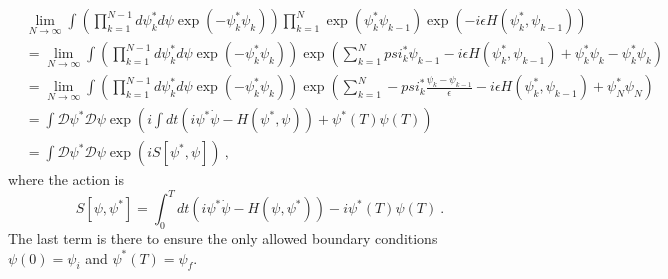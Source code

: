     \begin{equation*}
    \begin{aligned}
        & \lim_{N \rightarrow \infty} \int ( \prod_{k=1}^{N-1} d\psi^*_k d\psi \exp(- \psi^*_k \psi_k) ) \prod_{k=1}^{N} \exp(\psi^*_k \psi_{k-1}) \exp(- i \epsilon H (\psi^*_k, \psi_{k-1})) \\ & = \lim_{N \rightarrow \infty} \int ( \prod_{k=1}^{N-1} d\psi^*_k d\psi \exp(- \psi^*_k \psi_k) ) \exp( \sum_{k=1}^{N} psi^*_k \psi_{k-1} - i \epsilon H (\psi^*_k, \psi_{k-1}) + \psi^*_k \psi_k - \psi^*_k \psi_k) \\ & = \lim_{N \rightarrow \infty} \int ( \prod_{k=1}^{N-1} d\psi^*_k d\psi \exp(- \psi^*_k \psi_k) ) \exp( \sum_{k=1}^{N} - psi^*_k \frac{\psi_k - \psi_{k-1}}{\epsilon} - i \epsilon H (\psi^*_k, \psi_{k-1}) + \psi^*_N \psi_N) \\ & = \int \mathcal D \psi^* \mathcal D \psi \exp(i \int dt (i \psi^* \dot \psi - H(\psi^*, \psi)) + \psi^*(T) \psi(T)) \\ & = \int \mathcal D \psi^* \mathcal D \psi \exp(i S[\psi^*, \psi]) ~,
    \end{aligned}
    \end{equation*}
    where the action is 
    \begin{equation*}
        S[\psi, \psi^*] = \int_0^T dt (i \psi^* \dot \psi - H(\psi, \psi^*)) - i \psi^*(T) \psi(T) ~.
    \end{equation*}
    The last term is there to ensure the only allowed boundary conditions $\psi(0) = \psi_i$ and $\psi^*(T) = \psi_f$.
